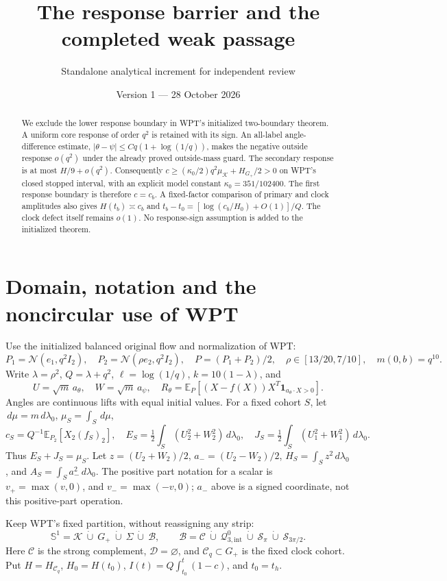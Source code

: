 \documentclass[11pt]{article}
\title{The response barrier and the completed weak passage}
\author{Standalone analytical increment for independent review}
\date{Version 1 --- 28 October 2026}
\numberwithin{equation}{section}
\theoremstyle{remark}\newtheorem{remark}[theorem]{Remark}
\newcommand{\E}{\mathbb E}
\newcommand{\dd}{\,d}
\newcommand{\one}{\mathbf1}
\newcommand{\KK}{\mathcal K}
\newcommand{\BB}{\mathcal B}
\newcommand{\Gp}{G_+}
\newcommand{\Clk}{\mathcal C_q}
\begin{document}
\maketitle
\begin{abstract}
We exclude the lower response boundary in WPT's initialized
two-boundary theorem. A uniform core response of order $q^2$ is
retained with its sign. An all-label angle-difference estimate,
$|\theta-\psi|\le Cq(1+\log(1/q))$, makes the negative outside
response $o(q^2)$ under the already proved outside-mass guard.
The secondary response is at most $H/9+o(q^2)$. Consequently
$c\ge (\kappa_0/2)q^2\mu_{\KK}+H_{\Gp}/2>0$ on WPT's
closed stopped interval, with an explicit model constant
$\kappa_0=351/102400$. The first response boundary is therefore
$c=c_b$. A fixed-factor comparison of primary and clock amplitudes
also gives $H(t_b)\asymp c_b$ and
$t_b-t_0=[\log(c_b/H_0)+O(1)]/Q$. The clock defect itself remains
$o(1)$. No response-sign assumption is added to the initialized theorem.
\end{abstract}

\section{Domain, notation and the noncircular use of WPT}
\label{an03rbv1:domain}
Use the initialized balanced original flow and normalization of WPT:
\[
 P_1=\mathcal N(e_1,q^2I_2),\quad
 P_2=\mathcal N(\rho e_2,q^2I_2),\quad P=(P_1+P_2)/2,
 \quad \rho\in[13/20,7/10],\quad m(0,b)=q^{10}.
\]
Write $\lambda=\rho^2$, $Q=\lambda+q^2$, $\ell=\log(1/q)$,
$k=10(1-\lambda)$, and
\[
 U=\sqrt m\,a_\theta,\quad W=\sqrt m\,a_\psi,\quad
 R_\theta=\E_P[(X-f(X))X^T\one_{a_\theta\cdot X>0}].
\]
Angles are continuous lifts with equal initial values. For a fixed
cohort $S$, let $\dd\mu=m\dd\lambda_0$, $\mu_S=\int_S\dd\mu$,
\[
 c_S=Q^{-1}\E_{P_2}[X_2(f_S)_2],\quad
 E_S=\tfrac12\int_S(U_2^2+W_2^2)\dd\lambda_0,\quad
 J_S=\tfrac12\int_S(U_1^2+W_1^2)\dd\lambda_0.
\]
Thus $E_S+J_S=\mu_S$. Let
$z=(U_2+W_2)/2$, $a_-=(U_2-W_2)/2$,
$H_S=\int_Sz^2\dd\lambda_0$, and $A_S=\int_Sa_-^2\dd\lambda_0$.
The positive part notation for a scalar is $v_+=\max(v,0)$,
and $v_-=\max(-v,0)$; $a_-$ above is a signed coordinate,
not this positive-part operation.

Keep WPT's fixed partition, without reassigning any strip:
\begin{equation}
 \mathbb S^1=\KK\ \dot\cup\ \Gp\ \dot\cup\ \Sigma\ \dot\cup\ \BB,
 \qquad
 \BB=\mathcal C\ \dot\cup\ \mathcal Q_{3,\mathrm{int}}^0
       \ \dot\cup\ \mathcal S_\pi\ \dot\cup\ \mathcal S_{3\pi/2}.
 \label{an03rbv1:partition}
\end{equation}
Here $\mathcal C$ is the strong complement, $\mathcal D=\varnothing$,
and $\Clk\subset\Gp$ is the fixed clock cohort. Put
$H=H_{\Clk}$, $H_0=H(t_0)$,
$I(t)=Q\int_{t_0}^t(1-c)$, and $t_0=t_h$.
\end{document}
